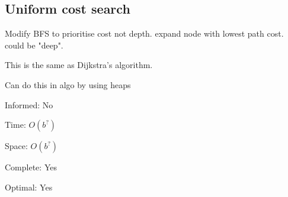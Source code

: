
\subsection{Uniform cost search}

Modify BFS to prioritise cost not depth. expand node with lowest path cost. could be "deep".

This is the same as Dijkstra’s algorithm.

Can do this in algo by using heaps

Informed: No

Time: \(O(b^{?})\)

Space: \(O(b^{?})\)

Complete: Yes

Optimal: Yes

